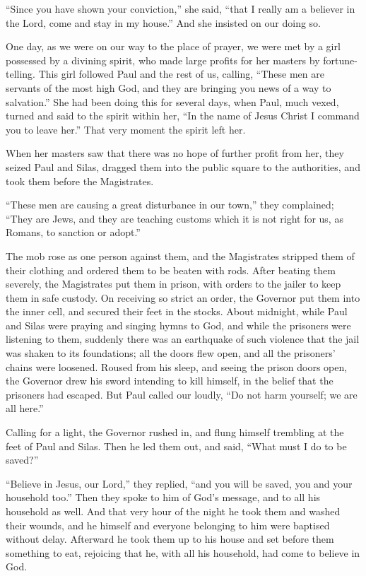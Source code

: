 ``Since you have shown your conviction,'' she said, ``that I really am a
believer in the Lord, come and stay in my house.'' And she insisted on
our doing so.

 One day, as we were on our way to the place of prayer, we
were met by a girl possessed by a divining spirit, who made large
profits for her masters by fortune-telling.  This girl
followed Paul and the rest of us, calling, ``These men are servants of
the most high God, and they are bringing you news of a way to
salvation.''  She had been doing this for several days,
when Paul, much vexed, turned and said to the spirit within her, ``In
the name of Jesus Christ I command you to leave her.'' That very moment
the spirit left her.

 When her masters saw that there was no hope of further
profit from her, they seized Paul and Silas, dragged them into the
public square to the authorities,  and took them before the
Magistrates.

``These men are causing a great disturbance in our town,'' they
complained;  ``They are Jews, and they are teaching customs
which it is not right for us, as Romans, to sanction or adopt.''

 The mob rose as one person against them, and the
Magistrates stripped them of their clothing and ordered them to be
beaten with rods.  After beating them severely, the
Magistrates put them in prison, with orders to the jailer to keep them
in safe custody.  On receiving so strict an order, the
Governor put them into the inner cell, and secured their feet in the
stocks.  About midnight, while Paul and Silas were praying
and singing hymns to God, and while the prisoners were listening to
them,  suddenly there was an earthquake of such violence
that the jail was shaken to its foundations; all the doors flew open,
and all the prisoners' chains were loosened.  Roused from
his sleep, and seeing the prison doors open, the Governor drew his sword
intending to kill himself, in the belief that the prisoners had escaped.
 But Paul called our loudly, ``Do not harm yourself; we are
all here.''

 Calling for a light, the Governor rushed in, and flung
himself trembling at the feet of Paul and Silas.  Then he
led them out, and said, ``What must I do to be saved?''

 ``Believe in Jesus, our Lord,'' they replied, ``and you
will be saved, you and your household too.''  Then they
spoke to him of God's message, and to all his household as well.
 And that very hour of the night he took them and washed
their wounds, and he himself and everyone belonging to him were baptised
without delay.  Afterward he took them up to his house and
set before them something to eat, rejoicing that he, with all his
household, had come to believe in God.

